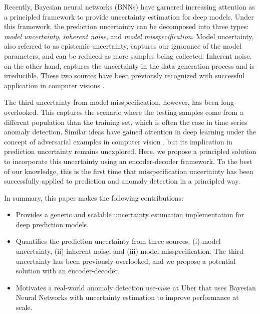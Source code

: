 \documentclass[conference,compsoc,final]{IEEEtran}
\begin{document}
Recently, Bayesian neural networks (BNNs) have garnered increasing attention as a principled framework to provide uncertainty estimation for deep models. 
Under this framework, the prediction uncertainty can be decomposed into three types: {\it model uncertainty}, {\it inherent noise}, and {\it model misspecification}. Model uncertainty, also referred to as epistemic uncertainty, captures our ignorance of the model parameters, and can be reduced as more samples being collected. Inherent noise, on the other hand, captures the uncertainty in the data generation process and is irreducible. These two sources have been previously recognized with successful application in computer visions \cite{kendall2017uncertainties}. 

The third uncertainty from model misspecification, however, has been long-overlooked. This captures the scenario where the testing samples come from a different population than the training set, which is often the case in time series anomaly detection. 
Similar ideas have gained attention in deep learning under the concept of adversarial examples in computer vision \cite{goodfellow2014explaining}, but its implication in prediction uncertainty remains unexplored. Here, we propose a principled solution to incorporate this uncertainty using an encoder-decoder framework. To the best of our knowledge, this is the first time that misspecification uncertainty has been successfully applied to prediction and anomaly detection in a principled way.

In summary, this paper makes the following contributions:
\begin{itemize}
  
  \item Provides a generic and scalable uncertainty estimation implementation for deep prediction models.
  \item Quantifies the prediction uncertainty from three sources: (i) model uncertainty, (ii) inherent noise, and (iii) model misspecification. The third uncertainty has been previously overlooked, and we propose a potential solution with an encoder-decoder.
  \item Motivates a real-world anomaly detection use-case at Uber 
  that uses Bayesian Neural Networks with uncertainty estimation to improve performance at scale.
\end{itemize}
\end{document}
